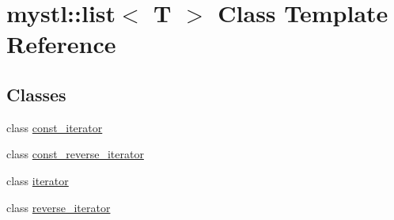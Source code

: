 \hypertarget{classmystl_1_1list}{}\section{mystl\+:\+:list$<$ T $>$ Class Template Reference}
\label{classmystl_1_1list}
\subsection*{Classes}
\begin{DoxyCompactItemize}
\item 
class \hyperlink{classmystl_1_1list_1_1const__iterator}{const\+\_\+iterator}
\item 
class \hyperlink{classmystl_1_1list_1_1const__reverse__iterator}{const\+\_\+reverse\+\_\+iterator}
\item 
class \hyperlink{classmystl_1_1list_1_1iterator}{iterator}
\item 
class \hyperlink{classmystl_1_1list_1_1reverse__iterator}{reverse\+\_\+iterator}
\end{DoxyCompactItemize}
